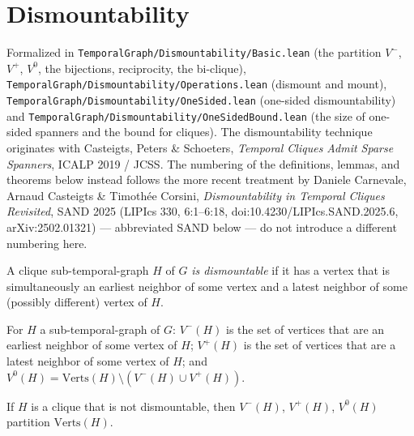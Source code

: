 \chapter{Dismountability}
\label{chap:dismountability}

\noindent Formalized in \texttt{TemporalGraph/Dismountability/Basic.lean} (the
partition $V^-$, $V^+$, $V^0$, the bijections, reciprocity, the bi-clique),
\texttt{TemporalGraph/Dismountability/Operations.lean} (dismount and mount),
\texttt{TemporalGraph/Dismountability/OneSided.lean} (one-sided
dismountability) and \texttt{TemporalGraph/Dismountability/OneSidedBound.lean}
(the size of one-sided spanners and the bound for cliques). The dismountability
technique originates with Casteigts, Peters \& Schoeters, \emph{Temporal
Cliques Admit Sparse Spanners}, ICALP 2019 / JCSS. The numbering of the
definitions, lemmas, and theorems below instead follows the more recent
treatment by Daniele Carnevale, Arnaud Casteigts \& Timothée Corsini,
\emph{Dismountability in Temporal Cliques Revisited}, SAND 2025 (LIPIcs 330,
6:1--6:18, doi:10.4230/LIPIcs.SAND.2025.6, arXiv:2502.01321) — abbreviated
SAND below — do not introduce a different numbering here.
\bigskip

\begin{definition}
  \label{def:dismountable}
  \leanok
  A clique sub-temporal-graph $H$ of $G$ \emph{is dismountable} if it has a
  vertex that is simultaneously an earliest neighbor of some vertex and a
  latest neighbor of some (possibly different) vertex of $H$.
\end{definition}

\begin{definition}[$V^-$, $V^+$, $V^0$ --- SAND \S~3.1]
  \label{def:vminus-vplus-vzero}
  \leanok
  For $H$ a sub-temporal-graph of $G$: $V^-(H)$ is the set of vertices that
  are an earliest neighbor of some vertex of $H$; $V^+(H)$ is the set of
  vertices that are a latest neighbor of some vertex of $H$; and
  $V^0(H) = \mathrm{Verts}(H) \setminus (V^-(H) \cup V^+(H))$.
\end{definition}

\begin{lemma}
  \label{lem:partition-not-dismountable}
  \leanok
  If $H$ is a clique that is not dismountable, then $V^-(H)$, $V^+(H)$,
  $V^0(H)$ partition $\mathrm{Verts}(H)$.
\end{lemma}

